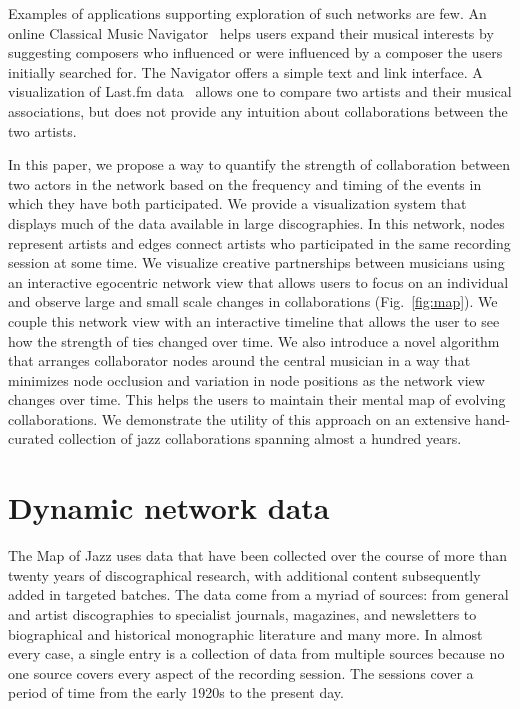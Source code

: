 \documentclass[12pt]{cmuthesis}
\begin{document}
  Examples of applications supporting exploration of such networks are few. An
  online Classical Music Navigator~\cite{Smith1999} helps users expand their
  musical interests by suggesting composers who influenced or were influenced by
  a composer the users initially searched for. The Navigator offers a simple text
  and link interface. A visualization of Last.fm data~\cite{Bieh-Zimmert2011}
  allows one to compare two artists and their musical associations, but does not
  provide any intuition about collaborations between the two artists.

  In this paper, we propose a way to quantify the strength of collaboration
  between two actors in the network based on the frequency and timing of the
  events in which they have both participated. We provide a visualization system
  that displays much of the data available in large discographies. In this
  network, nodes represent artists and edges connect artists who participated in
  the same recording session at some time. We visualize creative partnerships
  between musicians using an interactive egocentric network
  view that allows users to focus on an individual and observe large and small
  scale changes in collaborations (Fig.~\ref{fig:map}). We couple this network
  view with an interactive
  timeline that allows the user to see how the strength of ties changed over time.
  We also introduce a novel algorithm that arranges collaborator nodes around the
  central musician in a way that minimizes node occlusion and variation in node
  positions as the network view changes over time. This helps the users to
  maintain their mental map of evolving collaborations. We demonstrate the utility
  of this approach on an extensive hand-curated collection of jazz collaborations
  spanning almost a hundred years.

\section{Dynamic network data}


  The Map of Jazz uses data that have been collected over the course of more than
  twenty years of discographical research, with additional content subsequently
  added in targeted batches. The data come from a myriad of sources: from general and
  artist discographies to specialist journals, magazines, and newsletters to
  biographical and historical monographic literature and many more. In almost
  every case, a single entry is a collection of data from multiple sources because
  no one source covers every aspect of the recording session. The sessions cover a
  period of time from the early 1920s to the present day.
\end{document}
